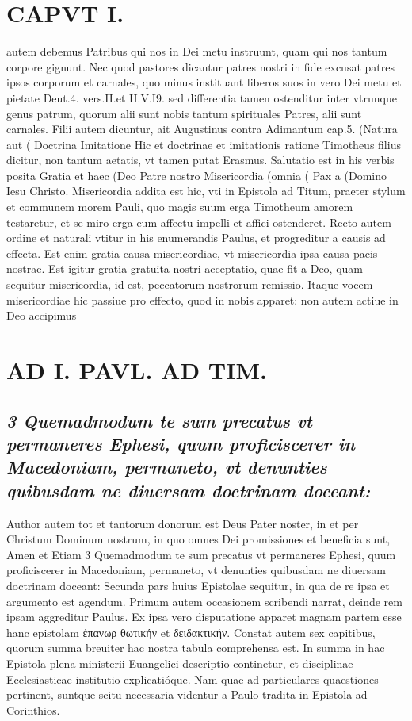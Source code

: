\documentclass{article}
\begin{document}
\begin{pages}
\section*{CAPVT  I. }
\marginpar{[ p.5 ]}\pstart autem debemus Patribus qui nos in Dei metu instruunt, quam qui nos tantum corpore gignunt. Nec quod pastores dicantur patres nostri in fide excusat patres ipsos corporum et carnales, quo minus instituant liberos suos in vero Dei metu et pietate Deut.4. vers.II.et II.V.I9. sed differentia tamen ostenditur inter vtrunque genus patrum, quorum alii sunt nobis tantum spirituales Patres, alii sunt carnales. Filii autem dicuntur, ait Augustinus contra Adimantum cap.5. (Natura aut ( Doctrina Imitatione Hic et doctrinae et imitationis ratione Timotheus filius dicitur, non tantum aetatis, vt tamen putat Erasmus. Salutatio est in his verbis posita Gratia et haec (Deo Patre nostro Misericordia (omnia ( Pax a (Domino Iesu Christo. Misericordia addita est hic, vti in Epistola ad Titum, praeter stylum et communem morem Pauli, quo magis suum erga Timotheum amorem testaretur, et se miro erga eum affectu impelli et affici ostenderet. Recto autem ordine et naturali vtitur in his enumerandis Paulus, et progreditur a causis ad effecta. Est enim gratia causa misericordiae, vt misericordia ipsa causa pacis nostrae. Est igitur gratia gratuita nostri acceptatio, quae fit a Deo, quam sequitur misericordia, id est, peccatorum nostrorum remissio. Itaque vocem misericordiae hic passiue pro effecto, quod in nobis apparet: non autem actiue in Deo accipimus  \pend
\section*{AD I. PAVL. AD TIM. }
\marginpar{[ p.6 ]}\pstart {}
{}
\subsection*{\textit{3 Quemadmodum te sum precatus vt permaneres Ephesi, quum proficiscerer in Macedoniam, permaneto, vt denunties quibusdam ne diuersam doctrinam doceant:}}Author autem tot et tantorum donorum est Deus Pater noster, in et per Christum Dominum nostrum, in quo omnes Dei promissiones et beneficia sunt, Amen et Etiam 3 Quemadmodum te sum precatus vt permaneres Ephesi, quum proficiscerer in Macedoniam, permaneto, vt denunties quibusdam ne diuersam doctrinam doceant: Secunda pars huius Epistolae sequitur, in qua de re ipsa et argumento est agendum. Primum autem occasionem scribendi narrat, deinde rem ipsam aggreditur Paulus. Ex ipsa vero disputatione apparet magnam partem esse hanc epistolam ἐπανωρ θωτικήν et δειδακτικήν. Constat autem sex capitibus, quorum summa breuiter hac nostra tabula comprehensa est. In summa in hac Epistola plena ministerii Euangelici descriptio continetur, et disciplinae Ecclesiasticae institutio explicatióque. Nam quae ad particulares quaestiones pertinent, suntque scitu necessaria videntur a Paulo tradita in Epistola ad Corinthios.  \pend

\end{pages}
\end{document}
